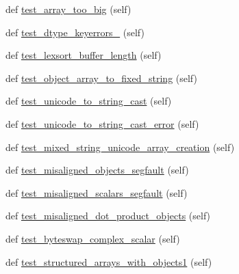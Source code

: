 \begin{DoxyCompactItemize}
\item 
def \hyperlink{classnumpy_1_1core_1_1tests_1_1test__regression_1_1TestRegression_a072e87c4bdc404402bc9fabc8562b5f9}{test\+\_\+array\+\_\+too\+\_\+big} (self)
\item 
def \hyperlink{classnumpy_1_1core_1_1tests_1_1test__regression_1_1TestRegression_a549eee35c695f7a3d7791323eb491d3c}{test\+\_\+dtype\+\_\+keyerrors\+\_\+} (self)
\item 
def \hyperlink{classnumpy_1_1core_1_1tests_1_1test__regression_1_1TestRegression_a18a483171448dc0c5ed6edb247289c25}{test\+\_\+lexsort\+\_\+buffer\+\_\+length} (self)
\item 
def \hyperlink{classnumpy_1_1core_1_1tests_1_1test__regression_1_1TestRegression_af07ce95a8f22ae6beaabc725d6e8d22c}{test\+\_\+object\+\_\+array\+\_\+to\+\_\+fixed\+\_\+string} (self)
\item 
def \hyperlink{classnumpy_1_1core_1_1tests_1_1test__regression_1_1TestRegression_acff1589537b2d8001124532a4d7e7a66}{test\+\_\+unicode\+\_\+to\+\_\+string\+\_\+cast} (self)
\item 
def \hyperlink{classnumpy_1_1core_1_1tests_1_1test__regression_1_1TestRegression_a2ba4cd528f24bc73a2f011fdf21a4b98}{test\+\_\+unicode\+\_\+to\+\_\+string\+\_\+cast\+\_\+error} (self)
\item 
def \hyperlink{classnumpy_1_1core_1_1tests_1_1test__regression_1_1TestRegression_ac07b7c9b35f22868c797a2f6ff07e254}{test\+\_\+mixed\+\_\+string\+\_\+unicode\+\_\+array\+\_\+creation} (self)
\item 
def \hyperlink{classnumpy_1_1core_1_1tests_1_1test__regression_1_1TestRegression_afe2b859da3cb0d8d9ff57072ce4ff7d5}{test\+\_\+misaligned\+\_\+objects\+\_\+segfault} (self)
\item 
def \hyperlink{classnumpy_1_1core_1_1tests_1_1test__regression_1_1TestRegression_abc3ee2fdbb51b3d351a2a289a9899bb2}{test\+\_\+misaligned\+\_\+scalars\+\_\+segfault} (self)
\item 
def \hyperlink{classnumpy_1_1core_1_1tests_1_1test__regression_1_1TestRegression_a9a77fd2797de7e563c3f15a8ea1da37b}{test\+\_\+misaligned\+\_\+dot\+\_\+product\+\_\+objects} (self)
\item 
def \hyperlink{classnumpy_1_1core_1_1tests_1_1test__regression_1_1TestRegression_a380d18d29ef21be887284721e22fba6b}{test\+\_\+byteswap\+\_\+complex\+\_\+scalar} (self)
\item 
def \hyperlink{classnumpy_1_1core_1_1tests_1_1test__regression_1_1TestRegression_a40b31caf1a72f49d0dd61cd68f607779}{test\+\_\+structured\+\_\+arrays\+\_\+with\+\_\+objects1} (self)

\end{DoxyCompactItemize}
